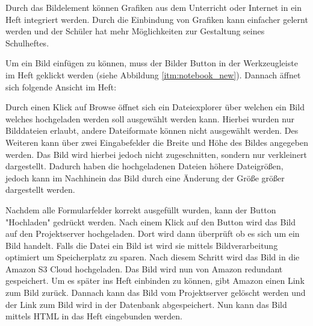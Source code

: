 
Durch das Bildelement können Grafiken aus dem Unterricht oder Internet in ein Heft integriert werden. Durch die Einbindung von Grafiken kann einfacher gelernt werden und der Schüler hat mehr Möglichkeiten zur Gestaltung seines Schulheftes.

Um ein Bild einfügen zu können, muss der Bilder Button in der Werkzeugleiste im Heft geklickt werden (siehe Abbildung \ref{itm:notebook_new}). Dannach äffnet sich folgende Ansicht im Heft:


Durch einen Klick auf Browse öffnet sich ein Dateiexplorer über welchen ein Bild welches hochgeladen werden soll ausgewählt werden kann. Hierbei wurden nur Bilddateien erlaubt, andere Dateiformate können nicht ausgewählt werden. Des Weiteren kann über zwei Eingabefelder die Breite und Höhe des Bildes angegeben werden. Das Bild wird hierbei jedoch nicht zugeschnitten, sondern nur verkleinert dargestellt. Dadurch haben die hochgeladenen Dateien höhere Dateigrößen, jedoch kann im Nachhinein das Bild durch eine Änderung der Größe größer dargestellt werden. 

Nachdem alle Formularfelder korrekt ausgefüllt wurden, kann der Button "Hochladen" gedrückt werden. Nach einem Klick auf den Button wird das Bild auf den Projektserver hochgeladen. Dort wird dann überprüft ob es sich um ein Bild handelt. Falls die Datei ein Bild ist wird sie mittels Bildverarbeitung optimiert um Speicherplatz zu sparen. Nach diesem Schritt wird das Bild in die Amazon S3 Cloud hochgeladen. Das Bild wird nun von Amazon redundant gespeichert. Um es später ins Heft einbinden zu können, gibt Amazon einen Link zum Bild zurück. Dannach kann das Bild vom Projektserver gelöscht werden und der Link zum Bild wird in der Datenbank abgespeichert. Nun kann das Bild mittels HTML in das Heft eingebunden werden. 
